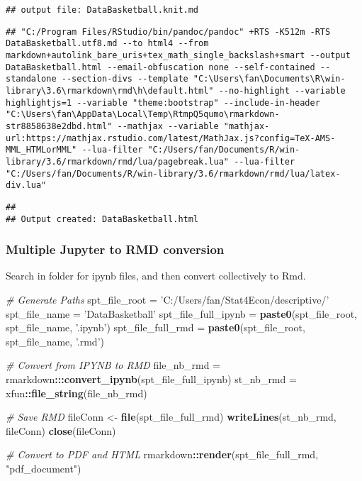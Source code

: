 \documentclass[
]{article}
\newenvironment{Shaded}{\begin{snugshade}}{\end{snugshade}}
\newcommand{\CommentTok}[1]{\textcolor[rgb]{0.56,0.35,0.01}{\textit{#1}}}
\newcommand{\KeywordTok}[1]{\textcolor[rgb]{0.13,0.29,0.53}{\textbf{#1}}}
\newcommand{\NormalTok}[1]{#1}
\newcommand{\OperatorTok}[1]{\textcolor[rgb]{0.81,0.36,0.00}{\textbf{#1}}}
\newcommand{\StringTok}[1]{\textcolor[rgb]{0.31,0.60,0.02}{#1}}
\begin{document}
\begin{verbatim}
## output file: DataBasketball.knit.md
\end{verbatim}

\begin{verbatim}
## "C:/Program Files/RStudio/bin/pandoc/pandoc" +RTS -K512m -RTS DataBasketball.utf8.md --to html4 --from markdown+autolink_bare_uris+tex_math_single_backslash+smart --output DataBasketball.html --email-obfuscation none --self-contained --standalone --section-divs --template "C:\Users\fan\Documents\R\win-library\3.6\rmarkdown\rmd\h\default.html" --no-highlight --variable highlightjs=1 --variable "theme:bootstrap" --include-in-header "C:\Users\fan\AppData\Local\Temp\RtmpQ5qumo\rmarkdown-str8858638e2dbd.html" --mathjax --variable "mathjax-url:https://mathjax.rstudio.com/latest/MathJax.js?config=TeX-AMS-MML_HTMLorMML" --lua-filter "C:/Users/fan/Documents/R/win-library/3.6/rmarkdown/rmd/lua/pagebreak.lua" --lua-filter "C:/Users/fan/Documents/R/win-library/3.6/rmarkdown/rmd/lua/latex-div.lua"
\end{verbatim}

\begin{verbatim}
## 
## Output created: DataBasketball.html
\end{verbatim}

\hypertarget{multiple-jupyter-to-rmd-conversion}{%
\subsubsection{Multiple Jupyter to RMD
conversion}\label{multiple-jupyter-to-rmd-conversion}}

Search in folder for ipynb files, and then convert collectively to Rmd.

\begin{Shaded}
\begin{Highlighting}[]
\CommentTok{# Generate Paths}
\NormalTok{spt_file_root =}\StringTok{ 'C:/Users/fan/Stat4Econ/descriptive/'}
\NormalTok{spt_file_name =}\StringTok{ 'DataBasketball'}
\NormalTok{spt_file_full_ipynb =}\StringTok{ }\KeywordTok{paste0}\NormalTok{(spt_file_root, spt_file_name, }\StringTok{'.ipynb'}\NormalTok{)}
\NormalTok{spt_file_full_rmd =}\StringTok{ }\KeywordTok{paste0}\NormalTok{(spt_file_root, spt_file_name, }\StringTok{'.rmd'}\NormalTok{)}

\CommentTok{# Convert from IPYNB to RMD}
\NormalTok{file_nb_rmd =}\StringTok{ }\NormalTok{rmarkdown}\OperatorTok{:::}\KeywordTok{convert_ipynb}\NormalTok{(spt_file_full_ipynb)}
\NormalTok{st_nb_rmd =}\StringTok{ }\NormalTok{xfun}\OperatorTok{::}\KeywordTok{file_string}\NormalTok{(file_nb_rmd)}

\CommentTok{# Save RMD}
\NormalTok{fileConn <-}\StringTok{ }\KeywordTok{file}\NormalTok{(spt_file_full_rmd)}
\KeywordTok{writeLines}\NormalTok{(st_nb_rmd, fileConn)}
\KeywordTok{close}\NormalTok{(fileConn)}

\CommentTok{# Convert to PDF and HTML}
\NormalTok{rmarkdown}\OperatorTok{::}\KeywordTok{render}\NormalTok{(spt_file_full_rmd, }\StringTok{"pdf_document"}\NormalTok{)}
\end{Highlighting}
\end{Shaded}
\end{document}
